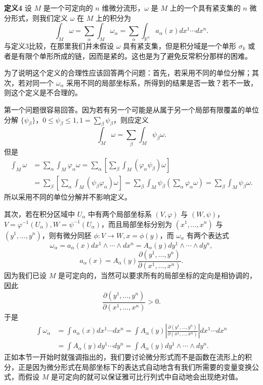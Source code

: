 \noindent\textbf{定义4}\quad
设 $M$ 是一个可定向的 $n$ 维微分流形，$\omega$ 是 $M$ 上的一个具有紧支集的 $n$ 微分形式，则我们定义 $\omega$ 在 $M$ 上的积分为
\begin{equation}
 \int_M\omega=\sum_\alpha\int_M\omega_\alpha
 =\sum_\alpha\int_{\mathbb R^n}a_\alpha(x)dx^1\cdots dx^n.
 \tag{23}
\end{equation}
与定义3比较，在那里我们并未假设 $\omega$ 具有紧支集，但是积分域是一个单形 $\sigma_k$ 或者是有限个单形所成的链，因而是紧的。这也是为了避免反常积分那样的困难。

为了说明这个定义的合理性应该回答两个问题：首先，若采用不同的单位分解；其次，若对同一个 $\omega_\alpha$ 采用不同的局部坐标系，所得到的结果是否一致？若不一致，则这个定义是不合理的。

第一个问题很容易回答。因为若有另一个可能是从属于另一个局部有限覆盖的单位分解 $\{\psi_\beta\}$，$0\le\psi_\beta\le1,1=\sum_\beta\psi_\beta$，则应定义
\[
 \int_M\omega=\sum_\beta\int_M\psi_\beta\omega.
\]
但是
\begin{align*}
 \int_M\omega
 &=\sum_\alpha\int_M\varphi_\alpha\omega
 =\sum_\alpha\left[\sum_\beta\int_M(\varphi_\alpha\psi_\beta)\omega\right]\\
 &=\sum_\beta\left[\sum_\alpha\int_M(\psi_\beta\varphi_\alpha)\omega\right]
 =\sum_\beta\int_M\psi_\beta\left(\sum_\alpha\varphi_\alpha\omega\right)
 =\sum_\beta\int_M\psi_\beta\omega.
\end{align*}
所以采用不同的单位分解并不影响定义。

其次，若在积分区域中 $U_\alpha$ 中有两个局部坐标系 $(V,\varphi)$ 与 $(W,\psi)$，$V=\varphi^{-1}(U_\alpha),W=\psi^{-1}(U_\alpha)$，而且局部坐标分别为 $(x^1,\ldots,x^n)$ 与 $(y^1,\ldots,y^n)$，则有微分同胚 $\phi:V\to W,x=\phi(y)$，而 $\omega_\alpha$ 有两个表达式
\[
 \omega_\alpha=a_\alpha(x)dx^1\wedge\cdots\wedge dx^n
 =A_\alpha(y)dy^1\wedge\cdots\wedge dy^n,
\]
\[
 a_\alpha(x)=A_\alpha(y)\frac{\partial(y^1,\ldots,y^n)}{\partial(x^1,\ldots,x^n)}.
\]
因为我们已设 $M$ 是可定向的，当然可以要求所有的局部坐标的定向是相协调的，因此
\[
 \frac{\partial(y^1,\ldots,y^n)}{\partial(x^1,\ldots,x^n)}>0.
\]
于是
\begin{align*}
 \int\omega_\alpha
 &=\int a_\alpha(x)dx^1\cdots dx^n
 =\int A_\alpha(y)\left|\frac{\partial(y^1,\ldots,y^n)}{\partial(x^1,\ldots,x^n)}\right|dx^1\cdots dx^n\\
 &=\int A_\alpha(y)dy^1\cdots dy^n
 =\int A_\alpha(y)dy^1\wedge\cdots\wedge dy^n.
\end{align*}
正如本节一开始时就强调指出的，我们要讨论微分形式而不是函数在流形上的积分，正是因为微分形式在局部坐标下的表达式自动地含有我们所需要的变量变换公式，而假设 $M$ 是可定向的就可以保证雅可比行列式中自动地会出现绝对值。

